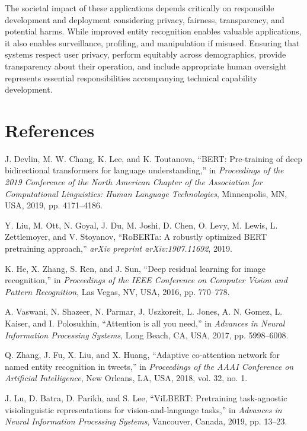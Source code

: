 \documentclass[12pt,a4paper]{report}
\begin{document}
The societal impact of these applications depends critically on responsible development and deployment considering privacy, fairness, transparency, and potential harms. While improved entity recognition enables valuable applications, it also enables surveillance, profiling, and manipulation if misused. Ensuring that systems respect user privacy, perform equitably across demographics, provide transparency about their operation, and include appropriate human oversight represents essential responsibilities accompanying technical capability development.

\chapter*{References}

\begin{thebibliography}{99}

J. Devlin, M. W. Chang, K. Lee, and K. Toutanova, ``BERT: Pre-training of deep bidirectional transformers for language understanding,'' in \textit{Proceedings of the 2019 Conference of the North American Chapter of the Association for Computational Linguistics: Human Language Technologies}, Minneapolis, MN, USA, 2019, pp. 4171--4186.

Y. Liu, M. Ott, N. Goyal, J. Du, M. Joshi, D. Chen, O. Levy, M. Lewis, L. Zettlemoyer, and V. Stoyanov, ``RoBERTa: A robustly optimized BERT pretraining approach,'' \textit{arXiv preprint arXiv:1907.11692}, 2019.

K. He, X. Zhang, S. Ren, and J. Sun, ``Deep residual learning for image recognition,'' in \textit{Proceedings of the IEEE Conference on Computer Vision and Pattern Recognition}, Las Vegas, NV, USA, 2016, pp. 770--778.

A. Vaswani, N. Shazeer, N. Parmar, J. Uszkoreit, L. Jones, A. N. Gomez, L. Kaiser, and I. Polosukhin, ``Attention is all you need,'' in \textit{Advances in Neural Information Processing Systems}, Long Beach, CA, USA, 2017, pp. 5998--6008.

Q. Zhang, J. Fu, X. Liu, and X. Huang, ``Adaptive co-attention network for named entity recognition in tweets,'' in \textit{Proceedings of the AAAI Conference on Artificial Intelligence}, New Orleans, LA, USA, 2018, vol. 32, no. 1.

J. Lu, D. Batra, D. Parikh, and S. Lee, ``ViLBERT: Pretraining task-agnostic visiolinguistic representations for vision-and-language tasks,'' in \textit{Advances in Neural Information Processing Systems}, Vancouver, Canada, 2019, pp. 13--23.


\end{thebibliography}
\end{document}
